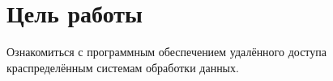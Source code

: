 \thispagestyle{empty}
\section*{Цель работы}

Ознакомиться  с  программным  обеспечением  удалённого  доступа  краспределённым системам обработки данных.